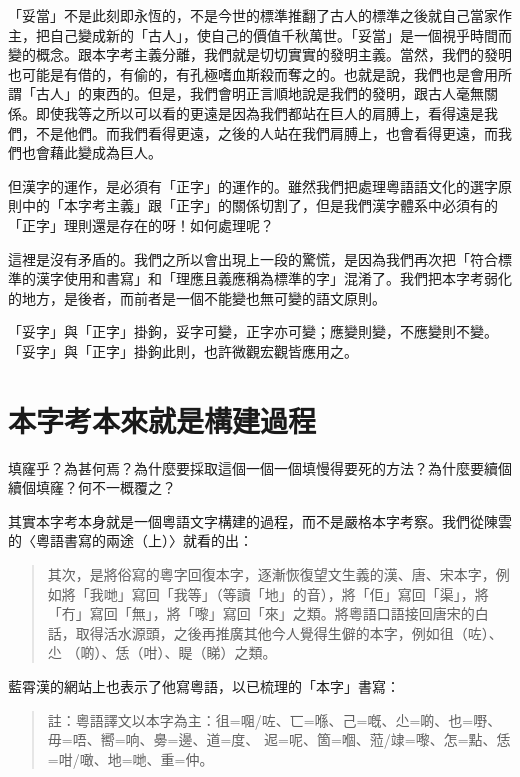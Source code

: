 \documentclass[a5paper, 10pt, openany]{book} %
\begin{document}
「妥當」不是此刻即永恆的，不是今世的標準推翻了古人的標準之後就自己當家作主，把自己變成新的「古人」，使自己的價值千秋萬世。「妥當」是一個視乎時間而變的概念。跟本字考主義分離，我們就是切切實實的發明主義。當然，我們的發明也可能是有借的，有偷的，有孔極嗜血斯殺而奪之的。也就是說，我們也是會用所謂「古人」的東西的。但是，我們會明正言順地說是我們的發明，跟古人毫無關係。即使我等之所以可以看的更遠是因為我們都站在巨人的肩膊上，看得遠是我們，不是他們。而我們看得更遠，之後的人站在我們肩膊上，也會看得更遠，而我們也會藉此變成為巨人。

但漢字的運作，是必須有「正字」的運作的。雖然我們把處理粵語語文化的選字原則中的「本字考主義」跟「正字」的關係切割了，但是我們漢字體系中必須有的「正字」理則還是存在的呀！如何處理呢？

這裡是沒有矛盾的。我們之所以會出現上一段的驚慌，是因為我們再次把「符合標準的漢字使用和書寫」和「理應且義應稱為標準的字」混淆了。我們把本字考弱化的地方，是後者，而前者是一個不能變也無可變的語文原則。

「妥字」與「正字」掛鉤，妥字可變，正字亦可變；應變則變，不應變則不變。「妥字」與「正字」掛鉤此則，也許微觀宏觀皆應用之。

\section{本字考本來就是構建過程}

填窿乎？為甚何焉？為什麼要採取這個一個一個填慢得要死的方法？為什麼要續個續個填窿？何不一概覆之？ 

其實本字考本身就是一個粵語文字構建的過程，而不是嚴格本字考察。我們從陳雲的〈粵語書寫的兩途（上）〉就看的出：

\begin{quotation}
  其次，是將俗寫的粵字回復本字，逐漸恢復望文生義的漢、唐、宋本字，例如將「我哋」寫回「我等」（等讀「地」的音），將「佢」寫回「渠」，將「冇」寫回「無」，將「嚟」寫回「來」之類。將粵語口語接回唐宋的白話，取得活水源頭，之後再推廣其他今人覺得生僻的本字，例如徂（咗）、尐 （啲）、恁（咁）、睼（睇）之類。 
  
\end{quotation}

藍霄漢的網站上也表示了他寫粵語，以已梳理的「本字」書寫：

\begin{quotation}
  註：粵語譯文以本字為主：徂=唨/咗、匸=喺、己=嘅、尐=啲、也=嘢、毋=唔、嚮=响、臱=邊、道=度、 迡=呢、箇=嗰、蒞/䇐=嚟、怎=點、恁=咁/噉、地=哋、重=仲。 
  
\end{quotation}
\end{document}
